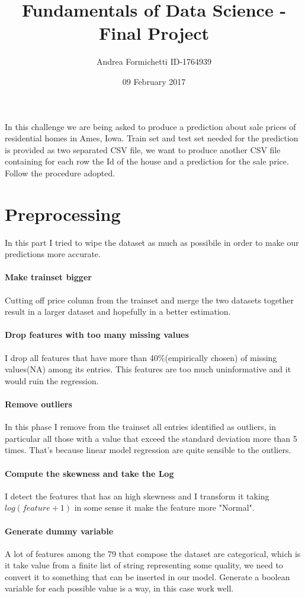 \documentclass[a4paper, 11pt]{article}
\title{\vspace{-3cm}%
  Fundamentals of Data Science - Final Project \\
  \large }
\author{Andrea Formichetti ID-1764939}
\date{09 February 2017}
\begin{document}
\maketitle

In this challenge we are being asked to produce a prediction about sale prices of residential homes in Ames, Iowa. Train set and  test set needed for the prediction is provided as two separated CSV file, we want to produce another CSV file containing for each row the Id of the house and a prediction for the sale price. Follow the procedure adopted.

\section{Preprocessing}
In this part I tried to wipe the dataset as much as possibile in order to make our predictions more accurate.
\paragraph{Make trainset bigger}
Cutting off price column from the trainset and merge the two datasets together result in a larger dataset and hopefully in a better estimation.
\paragraph{Drop features with too many missing values}
I drop all features that have more than 40\%(empirically chosen) of missing values(NA) among its entries. This features are too much uninformative and it would ruin the regression.
\paragraph{Remove outliers} 
In this phase I remove from the trainset all entries identified as outliers, in particular all those with a value that exceed the standard deviation more than 5 times. That's because linear model regression are quite sensible to the outliers. 
\paragraph{Compute the skewness and take the Log}
I detect the features that has an high skewness and I transform it taking $log(feature + 1)$ in some sense it make the feature more "Normal".
\paragraph{Generate dummy variable}
A lot of features among the 79 that compose the dataset are categorical, which is it take value from a finite list of string representing some quality, we need to convert it to something that can be inserted in our model. Generate a boolean variable for each possible value is a way, in this case work well.
\end{document}
